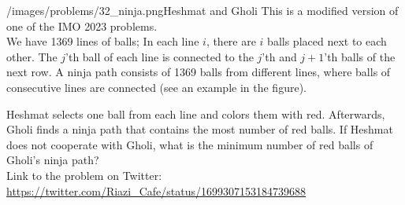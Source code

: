 \begin{problem}{/images/problems/32_ninja.png}{Heshmat and Gholi}
This  is a modified version of one of the IMO 2023 problems.\\[0.2cm]

We have 1369 lines of balls; In each line $i$, there are $i$ balls placed next to each other. The $j$'th ball of each line is connected to the $j$'th and $j+1$'th balls of the next row. A ninja path consists of 1369 balls from different lines, where balls of consecutive lines are connected (see an example in the figure).

Heshmat selects one ball from each line and colors them with red. Afterwards, Gholi finds a ninja path that contains the most number of red balls. If Heshmat does not cooperate with Gholi, what is the minimum number of red balls of Gholi's ninja path?\\[0.2cm]

Link to the problem on Twitter:  \url{https://twitter.com/Riazi_Cafe/status/1699307153184739688}\end{problem}
